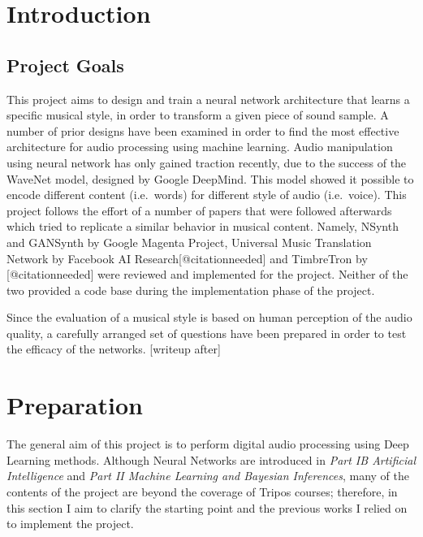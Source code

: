 \documentclass[]{report}
\date{}
\begin{document}
\hypertarget{introduction}{%
\chapter{Introduction}\label{introduction}}

\hypertarget{project-goals}{%
\section{Project Goals}\label{project-goals}}

This project aims to design and train a neural network architecture that
learns a specific musical style, in order to transform a given piece of
sound sample. A number of prior designs have been examined in order to
find the most effective architecture for audio processing using machine
learning. Audio manipulation using neural network has only gained
traction recently, due to the success of the WaveNet model, designed by
Google DeepMind. This model showed it possible to encode different
content (i.e.~words) for different style of audio (i.e.~voice). This
project follows the effort of a number of papers that were followed
afterwards which tried to replicate a similar behavior in musical
content. Namely, NSynth and GANSynth by Google Magenta Project,
Universal Music Translation Network by Facebook AI
Research{[}@citationneeded{]} and TimbreTron by {[}@citationneeded{]}
were reviewed and implemented for the project. Neither of the two
provided a code base during the implementation phase of the project.

Since the evaluation of a musical style is based on human perception of
the audio quality, a carefully arranged set of questions have been
prepared in order to test the efficacy of the networks. {[}writeup
after{]}

\hypertarget{preparation}{%
\chapter{Preparation}\label{preparation}}

The general aim of this project is to perform digital audio processing
using Deep Learning methods. Although Neural Networks are introduced in
\emph{Part IB Artificial Intelligence} and \emph{Part II Machine
Learning and Bayesian Inferences}, many of the contents of the project
are beyond the coverage of Tripos courses; therefore, in this section I
aim to clarify the starting point and the previous works I relied on to
implement the project.
\end{document}
